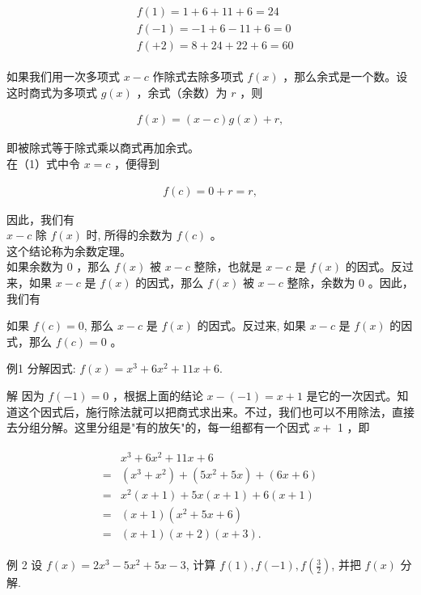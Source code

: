 \documentclass[10pt]{article}
\begin{document}
\begin{align*}
\begin{aligned}
& f(1)=1+6+11+6=24 \\
& f(-1)=-1+6-11+6=0 \\
& f(+2)=8+24+22+6=60
\end{aligned}
\end{align*}

如果我们用一次多项式 $x-c$ 作除式去除多项式 $f(x)$ ，那么余式是一个数。设这时商式为多项式 $g(x)$ ，余式（余数）为 $r$ ，则

\begin{align*}
f(x)=(x-c) g(x)+r, \tag{1}
\end{align*}

即被除式等于除式乘以商式再加余式。\\
在（1）式中令 $x=c$ ，便得到

\begin{align*}
f(c)=0+r=r,
\end{align*}

因此，我们有\\
$x-c$ 除 $f(x)$ 时, 所得的余数为 $f(c)$ 。\\
这个结论称为余数定理。\\
如果余数为 0 ，那么 $f(x)$ 被 $x-c$ 整除，也就是 $x-c$ 是 $f(x)$ 的因式。反过来，如果 $x-c$ 是 $f(x)$ 的因式，那么 $f(x)$ 被 $x-c$ 整除，余数为 0 。因此，我们有

如果 $f(c)=0$, 那么 $x-c$ 是 $f(x)$ 的因式。反过来, 如果 $x-c$ 是 $f(x)$ 的因式，那么 $f(c)=0$ 。

例1 分解因式: $f(x)=x^{3}+6 x^{2}+11 x+6$.

解 因为 $f(-1)=0$ ，根据上面的结论 $x-(-1)=x+1$ 是它的一次因式。知道这个因式后，施行除法就可以把商式求出来。不过，我们也可以不用除法，直接去分组分解。这里分组是"有的放矢"的，每一组都有一个因式 $x+$ 1 ，即

\begin{align*}
\begin{aligned}
& x^{3}+6 x^{2}+11 x+6 \\
= & \left(x^{3}+x^{2}\right)+\left(5 x^{2}+5 x\right)+(6 x+6) \\
= & x^{2}(x+1)+5 x(x+1)+6(x+1) \\
= & (x+1)\left(x^{2}+5 x+6\right) \\
= & (x+1)(x+2)(x+3) .
\end{aligned}
\end{align*}

例 2 设 $f(x)=2 x^{3}-5 x^{2}+5 x-3$, 计算 $f(1), f(-1), f\left(\frac{3}{2}\right)$, 并把 $f(x)$ 分解.
\end{document}
